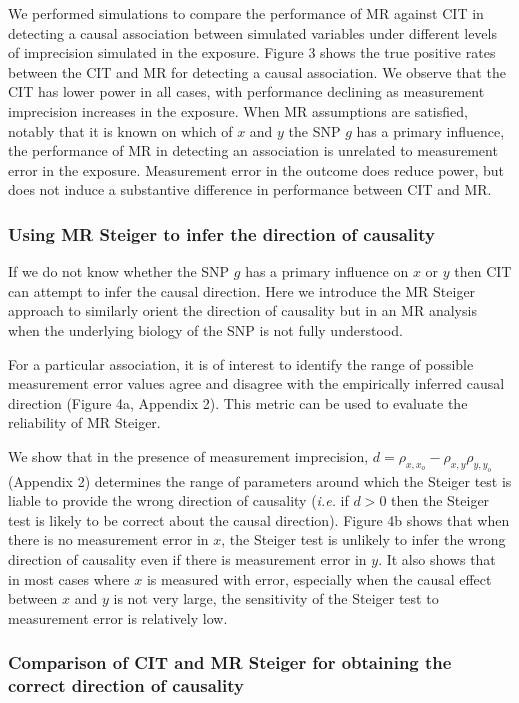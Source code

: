 \documentclass[]{article}
\begin{document}
We performed simulations to compare the performance of MR against CIT in
detecting a causal association between simulated variables under
different levels of imprecision simulated in the exposure. Figure 3
shows the true positive rates between the CIT and MR for detecting a
causal association. We observe that the CIT has lower power in all
cases, with performance declining as measurement imprecision increases
in the exposure. When MR assumptions are satisfied, notably that it is
known on which of \(x\) and \(y\) the SNP \(g\) has a primary influence,
the performance of MR in detecting an association is unrelated to
measurement error in the exposure. Measurement error in the outcome does
reduce power, but does not induce a substantive difference in
performance between CIT and MR.

\subsubsection{Using MR Steiger to infer the direction of
causality}\label{using-mr-steiger-to-infer-the-direction-of-causality}

If we do not know whether the SNP \(g\) has a primary influence on \(x\)
or \(y\) then CIT can attempt to infer the causal direction. Here we
introduce the MR Steiger approach to similarly orient the direction of
causality but in an MR analysis when the underlying biology of the SNP
is not fully understood.

For a particular association, it is of interest to identify the range of
possible measurement error values agree and disagree with the
empirically inferred causal direction (Figure 4a, Appendix 2). This
metric can be used to evaluate the reliability of MR Steiger.

We show that in the presence of measurement imprecision,
\(d = \rho_{x, x_o} - \rho_{x,y}\rho_{y,y_o}\) (Appendix 2) determines
the range of parameters around which the Steiger test is liable to
provide the wrong direction of causality (\emph{i.e.} if \(d>0\) then
the Steiger test is likely to be correct about the causal direction).
Figure 4b shows that when there is no measurement error in \(x\), the
Steiger test is unlikely to infer the wrong direction of causality even
if there is measurement error in \(y\). It also shows that in most cases
where \(x\) is measured with error, especially when the causal effect
between \(x\) and \(y\) is not very large, the sensitivity of the
Steiger test to measurement error is relatively low.

\subsubsection{Comparison of CIT and MR Steiger for obtaining the
correct direction of
causality}\label{comparison-of-cit-and-mr-steiger-for-obtaining-the-correct-direction-of-causality}
\end{document}
